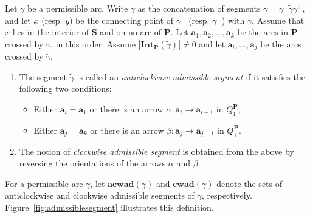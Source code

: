 \documentclass[a4paper,10pt]{amsart}
\theoremstyle{plain}          %
\theoremstyle{definition}
\def\SS{\mathbf{S}}
\def\af{\mathbf{a}}
\def\PP{\mathbf{P}}
\newcommand{\Int}{\mathbf{Int}}
\newcommand{\aad}{\mathbf{acwad}}
\newcommand{\cad}{\mathbf{cwad}}
\begin{document}
Let $\gamma$ be a permissible arc. Write $\gamma$ as the concatenation of segments $\gamma = \gamma^- \widetilde{\gamma} \gamma^+$, and let $x$ (resp. $y$) be the connecting point of $\gamma^-$ (resp. $\gamma^+$) with $\widetilde{\gamma}$. Assume that $x$ lies in the interior of $\SS$ and on no arc of $\PP$. Let $\af_1, \af_2, \ldots,\af_k$ be the arcs in $\PP$ crossed by $\gamma$, in this order. Assume $|\Int_\PP (\widetilde{\gamma})| \neq 0$ and  let $\af_i, \ldots,\af_j$ be the arcs crossed by $\widetilde{\gamma}$.
\begin{enumerate}
\item The segment $\tilde{\gamma}$ is called an {\it anticlockwise admissible segment} if it satisfies the following two conditions:  
\begin{itemize}
\item Either $\af_i =\af_1$ or there is an arrow $\alpha\colon \af_{i} \rightarrow \af_{i-1}$ in $Q_1^{\PP}$;

\item Either $\af_j =\af_k$ or there is an arrow $\beta\colon \af_{j} \rightarrow \af_{j+1}$ in $Q_1^{\PP}$.
\end{itemize}
\item The notion of {\it clockwise admissible segment} is obtained from the above by reversing the orientations of the arrows $\alpha$ and $\beta$. 
\end{enumerate}
For a permissible arc $\gamma$, let $\aad(\gamma)$ and $\cad(\gamma)$ denote the sets of anticlockwise and clockwise admissible segments of $\gamma$, respectively. Figure~\ref{fig:admissiblesegment} illustrates this definition.
\end{document}
